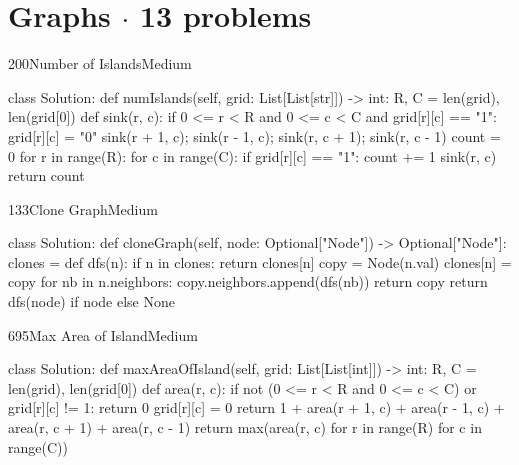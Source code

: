 \section{Graphs \texorpdfstring{{\normalsize\color{muted}$\cdot$ 13 problems}}{- 13 problems}}

\begin{problem}{200}{Number of Islands}{Medium}
\begin{code}
class Solution:
    def numIslands(self, grid: List[List[str]]) -> int:
        R, C = len(grid), len(grid[0])
        def sink(r, c):
            if 0 <= r < R and 0 <= c < C and grid[r][c] == "1":
                grid[r][c] = "0"
                sink(r + 1, c); sink(r - 1, c); sink(r, c + 1); sink(r, c - 1)
        count = 0
        for r in range(R):
            for c in range(C):
                if grid[r][c] == "1":
                    count += 1
                    sink(r, c)
        return count
\end{code}
\end{problem}

\begin{problem}{133}{Clone Graph}{Medium}
\begin{code}
class Solution:
    def cloneGraph(self, node: Optional["Node"]) -> Optional["Node"]:
        clones = {}
        def dfs(n):
            if n in clones:
                return clones[n]
            copy = Node(n.val)
            clones[n] = copy
            for nb in n.neighbors:
                copy.neighbors.append(dfs(nb))
            return copy
        return dfs(node) if node else None
\end{code}
\end{problem}

\begin{problem}{695}{Max Area of Island}{Medium}
\begin{code}
class Solution:
    def maxAreaOfIsland(self, grid: List[List[int]]) -> int:
        R, C = len(grid), len(grid[0])
        def area(r, c):
            if not (0 <= r < R and 0 <= c < C) or grid[r][c] != 1:
                return 0
            grid[r][c] = 0
            return 1 + area(r + 1, c) + area(r - 1, c) + area(r, c + 1) + area(r, c - 1)
        return max(area(r, c) for r in range(R) for c in range(C))
\end{code}
\end{problem}

